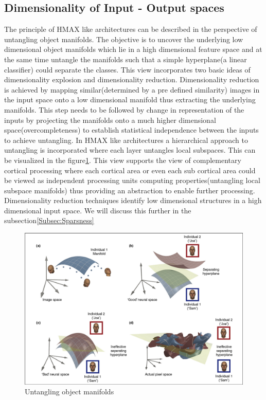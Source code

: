 \documentclass[12pt,twoside]{article}
\theoremstyle{plain}
\theoremstyle{definition}
\theoremstyle{remark}
\begin{document}
\subsection{Dimensionality of Input - Output spaces}
\label{Subsec:Dimen}
The principle of HMAX like architectures can be described in the perspective of untangling object manifolds\cite{JamesJ.DiCarlo2007}. The objective is to uncover the underlying low dimensional object manifolds which lie in a high dimensional feature space and at the same time untangle the manifolds such that a simple hyperplane(a linear classifier) could separate the classes. This view incorporates two basic ideas of dimensionality explosion and dimensionality reduction. Dimensionality reduction is achieved by mapping similar(determined by a pre defined similarity) images in the input space onto a low dimensional manifold thus extracting the underlying manifolds. This step needs to be followed by change in representation of the inputs by projecting the manifolds onto a much higher dimensional space(overcompleteness) to establish statistical independence between the inputs to achieve untangling. In HMAX like architectures a hierarchical approach to untangling is incorporated where each layer untangles local subspaces\cite{JamesJ.DiCarlo2007}. This can be visualized in the figure\ref{fig:Untangle}. This view supports the view of complementary cortical processing where each cortical area or even each sub cortical area could be viewed as independent processing units computing properties(untangling local subspace manifolds) thus providing an abstraction to enable further processing. Dimensionality reduction techniques identify low dimensional structures in a high dimensional input space. We will discuss this further in the subsection\ref{Subsec:Sparsness}

\begin{figure}[h]
\begin{center}
\includegraphics[scale=0.3]{manifolds}
\end{center}
\caption{Untangling object manifolds \cite{JamesJ.DiCarlo2007} }
\label{fig:Untangle}
\end{figure}
\end{document}
